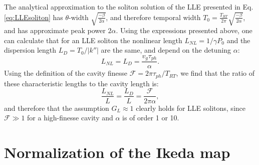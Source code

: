 The analytical approximation to the soliton solution of the LLE presented in Eq. \ref{eq:LLEsoliton} has $\theta$-width $\sqrt{\frac{-\beta}{2\alpha}}$, and therefore temporal width $T_0=\frac{T_{RT}}{2\pi} \sqrt{\frac{-\beta}{2\alpha}}$, and has approximate peak power $2\alpha$. Using the expressions presented above, one can calculate that for an LLE soliton the nonlinear length $L_{NL}=1/\gamma P_0$ and the dispersion length $L_D=T_0/|k''|$ are the same, and depend on the detuning $\alpha$:
\begin{equation}
L_{NL}=L_D=\frac{v_g\tau_{ph}}{\alpha}.
\end{equation}
Using the definition of the cavity finesse $\mathcal{F}=2\pi\tau_{ph}/T_{RT}$, we find that the ratio of these characteristic lengths to the cavity length is:
\begin{equation}
\frac{L_{NL}}{L}=\frac{L_D}{L}=\frac{\mathcal{F}}{2\pi\alpha},
\end{equation}
and therefore that the assumption $G_L\approx 1$ clearly holds for LLE solitons, since $\mathcal{F}\gg1$ for a high-finesse cavity and $\alpha$ is of order 1 or 10.

\section{Normalization of the Ikeda map}

